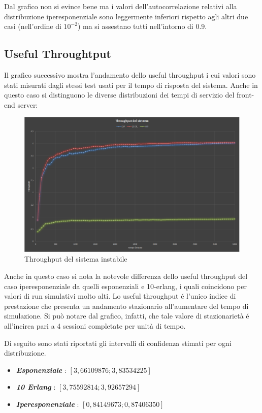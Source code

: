 Dal grafico non si evince bene ma i valori dell'autocorrelazione relativi alla 
distribuzione
iperesponenziale sono leggermente inferiori rispetto agli altri due casi 
(nell'ordine di $10^{-2}$)
ma si assestano tutti nell'intorno di 0.9.

\subsection{Useful Throughtput}

Il grafico successivo mostra l'andamento dello useful throughput i cui valori 
sono stati
misurati dagli stessi test usati per il tempo di risposta del sistema. Anche in 
questo caso si 
distinguono le diverse distribuzioni dei tempi di servizio del front-end server:

\begin{figure}[H]
 \centering
 \includegraphics[scale=0.45]{img/throughput.png}
 \caption[Throughput del sistema instabile]{Throughput del sistema instabile}
 \label{fig:Throughput del sistema instabile}
\end{figure}

Anche in questo caso si nota la notevole differenza dello useful throughput  del 
caso 
iperesponenziale da quelli esponenziali e 10-erlang, i quali coincidono per 
valori di run  
simulativi molto alti.
Lo useful throughput \'e l'unico indice di prestazione che presenta un andamento 
stazionario 
all'aumentare del tempo di simulazione. Si pu\`o notare dal grafico, infatti, 
che tale valore di 
stazionariet\`a \'e all'incirca pari a 4 sessioni completate per unit\`a di 
tempo.


Di seguito sono stati riportati gli intervalli di confidenza stimati per ogni 
distribuzione. 
\begin{itemize}
 \item \textit{\textbf{Esponenziale}} : $[ 3,66109876 ; 3,83534225 ]$
 \item \textit{\textbf{10 Erlang}} : $[ 3,75592814 ; 3,92657294 ]$
 \item \textit{\textbf{Iperesponenziale}} : $[ 0,84149673 ; 0,87406350 ]$
\end{itemize}

